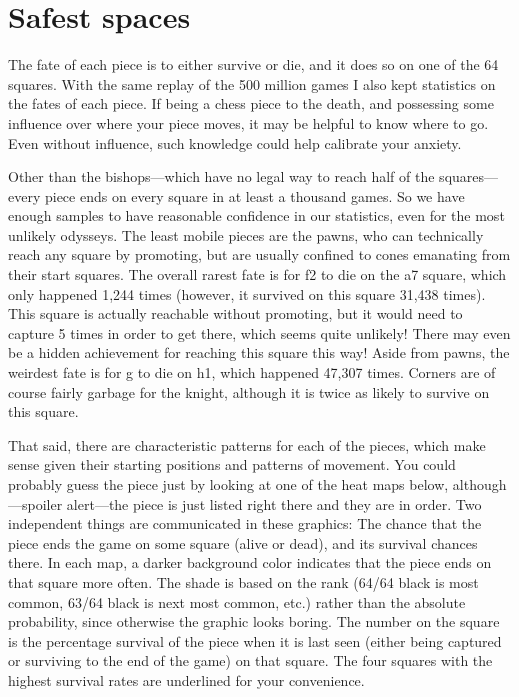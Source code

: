 \documentclass[twocolumn]{article}
\begin{document}
\section{Safest spaces}

The fate of each piece is to either survive or die, and it does so on
one of the 64 squares. With the same replay of the 500 million games
I also kept statistics on the fates of each piece. If being a chess
piece to the death, and possessing some influence over where your piece
moves, it may be helpful to know where to go. Even without influence,
such knowledge could help calibrate your anxiety.


Other than the bishops---which have no legal way to reach half of the
squares---every piece ends on every square in at least a thousand
games. So we have enough samples to have reasonable confidence in our
statistics, even for the most unlikely odysseys. The least mobile
pieces are the pawns, who can technically reach any square by
promoting, but are usually confined to cones emanating from their
start squares. The overall rarest fate is for \pawn f2 to die on the
a7 square, which only happened 1,244 times (however, it survived on
this square 31,438 times). This square is actually reachable without
promoting, but it would need to capture 5 times in order to get
there, which seems quite unlikely! There may even be a hidden
achievement for reaching this square this way!
Aside from pawns, the weirdest fate is for \knight g to die on h1,
which happened 47,307 times. Corners are of course fairly garbage for
the knight, although it is twice as likely to survive on this square.


That said, there are characteristic patterns for each of the pieces,
which make sense given their starting positions and patterns of
movement. You could probably guess the piece just by looking at one of
the heat maps below, although---spoiler alert---the piece is just
listed right there and they are in order. Two independent things are
communicated in these graphics: The chance that the piece ends the
game on some square (alive or dead), and its survival chances there.
In each map, a darker background color indicates that the piece ends
on that square more often. The shade is based on the rank (64/64 black
is most common, 63/64 black is next most common, etc.) rather than the
absolute probability, since otherwise the graphic looks boring. The
number on the square is the percentage survival of the piece when it
is last seen (either being captured or surviving to the end of the
game) on that square. The four squares with the highest survival rates
are underlined for your convenience.
\end{document}
